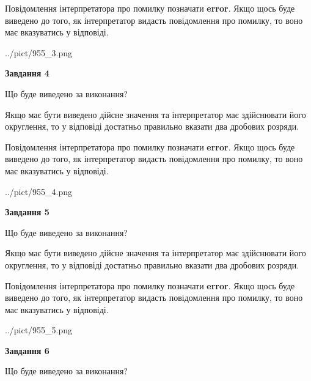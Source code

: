 \documentclass[12pt, ukrainian]{article}
\begin{document}
{\begin {Large}
Повідомлення інтерпретатора про помилку позначати \textbf{error}.
Якщо щось буде виведено до того, як інтерпретатор видасть повідомлення про помилку, 
то воно має вказуватись у відповіді. \par

\begin{center}
	{../pict/955_3.png}
\end{center}
\newpage

{\begin {center}\textbf{Завдання 4}\end {center}}\par
Що буде виведено за виконання? \par

Якщо має бути виведено дійсне значення та інтерпретатор має здійснювати його округлення, 
то у відповіді достатньо правильно вказати два дробових розряди.

Повідомлення інтерпретатора про помилку позначати \textbf{error}.
Якщо щось буде виведено до того, як інтерпретатор видасть повідомлення про помилку, 
то воно має вказуватись у відповіді. \par

\begin{center}
	{../pict/955_4.png}
\end{center}
\newpage

{\begin {center}\textbf{Завдання 5}\end {center}}\par
Що буде виведено за виконання? \par

Якщо має бути виведено дійсне значення та інтерпретатор має здійснювати його округлення, 
то у відповіді достатньо правильно вказати два дробових розряди.

Повідомлення інтерпретатора про помилку позначати \textbf{error}.
Якщо щось буде виведено до того, як інтерпретатор видасть повідомлення про помилку, 
то воно має вказуватись у відповіді. \par

\begin{center}
	{../pict/955_5.png}
\end{center}
\newpage

{\begin {center}\textbf{Завдання 6}\end {center}}\par
Що буде виведено за виконання? \par


\end{Large}}
\end{document}
